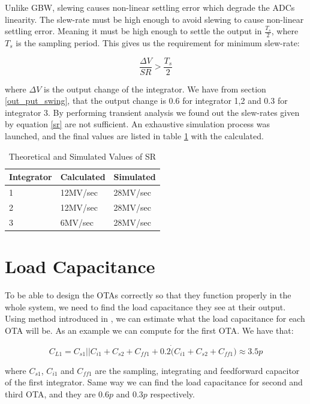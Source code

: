 Unlike GBW, slewing causes non-linear settling error which degrade the ADCs linearity. The slew-rate must be high enough to avoid slewing to cause non-linear settling error. Meaning it must be high enough to settle the output in $\frac{T_s}{2}$, where $T_s$ is the sampling period. This gives us the requirement for minimum slew-rate:

\begin{equation}\label{sr}
    \frac{\Delta V}{SR} > \frac{T_s}{2}
\end{equation}

where $\Delta V$ is the output change of the integrator. We have from section \ref{out_put_swing}, that the output change is 0.6 for integrator 1,2 and 0.3 for integrator 3. By performing transient analysis we found out the slew-rates given by equation \ref{sr} are not sufficient. An exhaustive simulation process was launched, and the final values are listed in table \ref{SR_final} with the calculated.

\begin{table}[H]
\centering
\caption{Theoretical and Simulated Values of SR}
\label{SR_final}
\begin{tabular}{|l|l|l|}
\hline
Integrator & Calculated & Simulated \\ \hline
1           & 12MV/sec   & 28MV/sec  \\ \hline
2           & 12MV/sec   & 28MV/sec  \\ \hline
3           & 6MV/sec    & 28MV/sec  \\ \hline
\end{tabular}
\end{table}

\section{Load Capacitance}
To be able to design the OTAs correctly so that they function properly in the whole system, we need to find the load capacitance they see at their output. Using method introduced in \cite{load}, we can estimate what the load capacitance for each OTA will be. As an example we can compute for the first OTA. We have that:

\begin{equation}\label{cap_load}
    C_{L1} = C_{s1}||C_{i1} + C_{s2} + C_{ff1} + 0.2\dot(C_{i1} + C_{s2} + C_{ff1}) \approx 3.5p 
\end{equation}

where $C_{s1}$, $C_{i1}$ and $C_{ff1}$ are the sampling, integrating and feedforward capacitor of the first integrator. Same way we can find the load capacitance for second and third OTA, and they are $0.6p$ and $0.3p$ respectively. 

